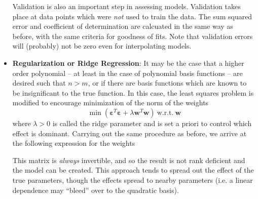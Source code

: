 \documentclass[12pt]{article}
\newcommand{\Item}[1]{\item \textbf{#1}:}
\newcommand{\CenteredBoxed}[1]{\begin{center}\boxed{#1}\end{center}}
\begin{document}
\begin{itemize}
Validation is also an important step in assessing models. Validation takes place at data points which were \emph{not} used to train the data. The sum squared error and coefficient of determination are calcuated in the same way as before, with the same criteria for goodness of fits. Note that validation errors will (probably) not be zero even for interpolating models.
\Item{Regularization or Ridge Regression} It may be the case that a higher order polynomial -- at least in the case of polynomial basis functions -- are desired such that $n>m$, or if there are basis functions which are known to be insignificant to the true function. In this case, the least squares problem is modified to encourage minimization of the norm of the weights
$$\min\left(\bm{\varepsilon}^T\bm{\varepsilon} + \lambda\bm{w}^T\bm{w}\right)\ \mathrm{w.r.t.}\ \bm{w}$$
where $\lambda>0$ is called the ridge parameter and is set a priori to control which effect is dominant. Carrying out the same procedure as before, we arrive at the following expression for the weights
\CenteredBoxed{\bm{w}=\left(\Phi^T\Phi+\lambda\mathbb{I}\right)^{-1}\Phi^T\bm{f}}
This matrix is \emph{always} invertible, and so the result is not rank deficient and the model can be created. This approach tends to spread out the effect of the true parameters, though the effects spread to nearby parameters (i.e. a linear dependence may ``bleed'' over to the quadratic basis).
\end{itemize}
\end{document}
